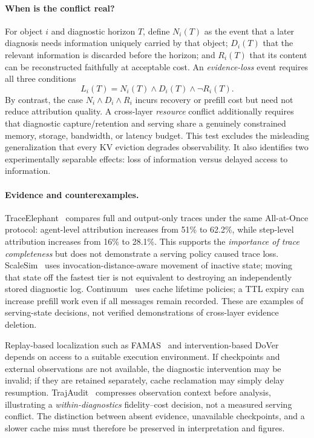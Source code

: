 \paragraph*{When is the conflict real?}
For object $i$ and diagnostic horizon $T$, define $N_i(T)$ as the event that a later diagnosis needs information uniquely carried by that object; $D_i(T)$ that the relevant information is discarded before the horizon; and $R_i(T)$ that its content can be reconstructed faithfully at acceptable cost. An \emph{evidence-loss} event requires all three conditions
\begin{equation}\label{eq:loss}
L_i(T)=N_i(T)\wedge D_i(T)\wedge\neg R_i(T).
\end{equation}
By contrast, the case $N_i\wedge D_i\wedge R_i$ incurs recovery or prefill cost but need not reduce attribution quality. A cross-layer \emph{resource} conflict additionally requires that diagnostic capture/retention and serving share a genuinely constrained memory, storage, bandwidth, or latency budget. This test excludes the misleading generalization that every KV eviction degrades observability. It also identifies two experimentally separable effects: loss of information versus delayed access to information.

\paragraph*{Evidence and counterexamples.}
TraceElephant~\cite{traceelephant2026} compares full and output-only traces under the same All-at-Once protocol: agent-level attribution increases from 51\% to 62.2\%, while step-level attribution increases from 16\% to 28.1\%. This supports the \emph{importance of trace completeness} but does not demonstrate a serving policy caused trace loss. ScaleSim~\cite{zhou2026} uses invocation-distance-aware movement of inactive state; moving that state off the fastest tier is not equivalent to destroying an independently stored diagnostic log. Continuum~\cite{continuum2025} uses cache lifetime policies; a TTL expiry can increase prefill work even if all messages remain recorded. These are examples of serving-state decisions, not verified demonstrations of cross-layer evidence deletion.

Replay-based localization such as FAMAS~\cite{famas2025} and intervention-based DoVer~\cite{dover2026} depends on access to a suitable execution environment. If checkpoints and external observations are not available, the diagnostic intervention may be invalid; if they are retained separately, cache reclamation may simply delay resumption. TrajAudit~\cite{trajaudit2026} compresses observation context before analysis, illustrating a \emph{within-diagnostics} fidelity--cost decision, not a measured serving conflict. The distinction between absent evidence, unavailable checkpoints, and a slower cache miss must therefore be preserved in interpretation and figures.

